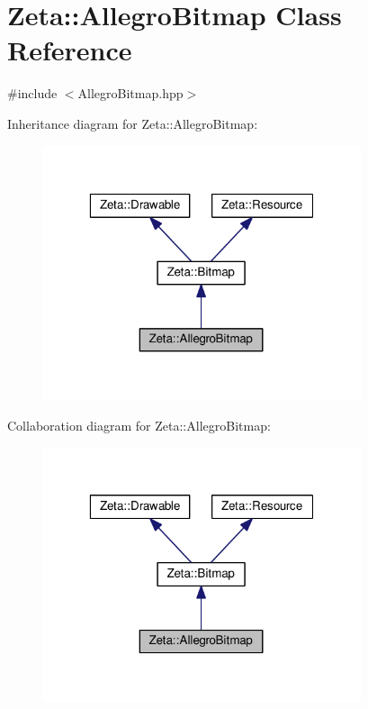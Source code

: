 \hypertarget{classZeta_1_1AllegroBitmap}{\section{Zeta\+:\+:Allegro\+Bitmap Class Reference}
\label{classZeta_1_1AllegroBitmap}
}


{\ttfamily \#include $<$Allegro\+Bitmap.\+hpp$>$}



Inheritance diagram for Zeta\+:\+:Allegro\+Bitmap\+:\nopagebreak
\begin{figure}[H]
\begin{center}
\leavevmode
\includegraphics[width=265pt]{classZeta_1_1AllegroBitmap__inherit__graph}
\end{center}
\end{figure}


Collaboration diagram for Zeta\+:\+:Allegro\+Bitmap\+:\nopagebreak
\begin{figure}[H]
\begin{center}
\leavevmode
\includegraphics[width=265pt]{classZeta_1_1AllegroBitmap__coll__graph}
\end{center}
\end{figure}
